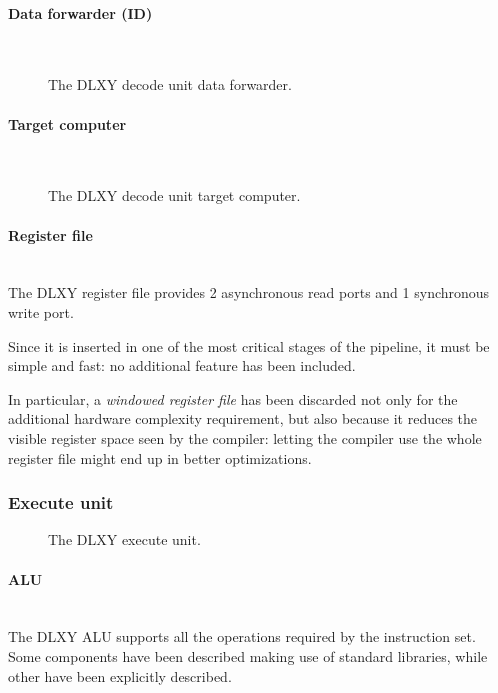 \paragraph{Data forwarder (ID)} \mbox{} \\
\begin{figure}[H]
	\centering
	\caption{The DLXY decode unit data forwarder.}
	\label{fig:id_fwd}
\end{figure}
\paragraph{Target computer} \mbox{} \\
\begin{figure}[H]
	\centering
	\caption{The DLXY decode unit target computer.}
	\label{fig:target_computer}
\end{figure}
\paragraph{Register file} \mbox{} \\
The DLXY register file provides 2 asynchronous read ports and 1 synchronous
write port.

\bigskip
Since it is inserted in one of the most critical stages of the pipeline, it must
be simple and fast: no additional feature has been included.

In particular, a \textit{windowed register file} has been discarded not only for
the additional hardware complexity requirement, but also because it reduces the
visible register space seen by the compiler: letting the compiler use the whole
register file might end up in better optimizations.
\subsubsection{Execute unit}
\begin{figure}[H]
	\centering
	\caption{The DLXY execute unit.}
	\label{fig:execute_unit}
\end{figure}

\paragraph{ALU} \mbox{} \\
The DLXY ALU supports all the operations required by the instruction set.
Some components have been described making use of standard libraries, while
other have been explicitly described.

